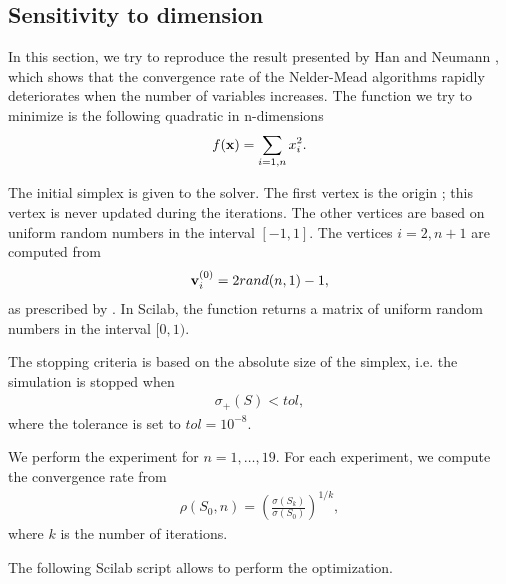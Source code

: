 \subsection{Sensitivity to dimension}

In this section, we try to reproduce the result 
presented by Han and Neumann \cite{HanNeumann2006}, which shows that the 
convergence rate of the Nelder-Mead algorithms rapidly 
deteriorates when the number of variables increases.
The function we try to minimize is the following quadratic 
in n-dimensions 
\begin{eqnarray}
\label{quadratic-function3}
f(\bold{x}) = \sum_{i=1,n} x_i^2.
\end{eqnarray}

The initial simplex is given to the solver.
The first vertex is the origin ; this vertex is never updated during the iterations.
The other vertices are based on uniform random numbers in the interval $[-1,1]$.
The vertices $i=2,n+1$ are computed from 
\begin{eqnarray}
\mathbf{v}_i^{(0)} = 2 rand(n,1) - 1,
\end{eqnarray}
as prescribed by \cite{HanNeumann2006}.
In Scilab, the  function returns a matrix of 
uniform random numbers in the interval $[0,1)$.

The stopping criteria is based on the absolute size of the simplex, i.e.
the simulation is stopped when 
\begin{eqnarray}
\sigma_+(S) < tol,
\end{eqnarray}
where the tolerance is set to $tol=10^{-8}$.

We perform the experiment for $n=1,\ldots,19$. 
For each experiment, we compute the convergence rate from
\begin{eqnarray}
\rho(S_0,n) = \left( \frac{\sigma(S_{k})}{\sigma(S_0)}\right)^{1/k},
\end{eqnarray}
where $k$ is the number of iterations.

The following Scilab script allows to perform the optimization.

